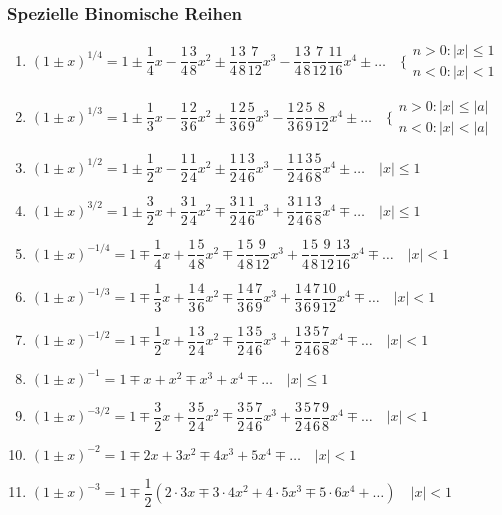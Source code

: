 \subsubsection{Spezielle Binomische Reihen}
\begin{enumerate}[$(a)$]
\item $\left(1\pm x\right)^{1/4}=1\pm \dfrac{1}{4}x-\dfrac{1}{4}\dfrac{3}{8}x^2\pm \dfrac{1}{4}\dfrac{3}{8}\dfrac{7}{12}x^3-\dfrac{1}{4}\dfrac{3}{8}\dfrac{7}{12}\dfrac{11}{16}x^4\pm \dotso\quad \Bigg\{\begin{matrix}n>0: \Big\vert x\Big\vert\leq 1\\n<0: \Big\vert x\Big\vert< 1\end{matrix}$
\item $\left(1\pm x\right)^{1/3}=1\pm \dfrac{1}{3}x-\dfrac{1}{3}\dfrac{2}{6}x^2\pm \dfrac{1}{3}\dfrac{2}{6}\dfrac{5}{9}x^3-\dfrac{1}{3}\dfrac{2}{6}\dfrac{5}{9}\dfrac{8}{12}x^4\pm \dotso\quad \Bigg\{\begin{matrix}n>0: \Big\vert x\Big\vert\leq \Big\vert a\Big\vert\\n<0: \Big\vert x\Big\vert< \Big\vert a\Big\vert\end{matrix}$
\item $\left(1\pm x\right)^{1/2}=1\pm \dfrac{1}{2}x-\dfrac{1}{2}\dfrac{1}{4}x^2\pm \dfrac{1}{2}\dfrac{1}{4}\dfrac{3}{6}x^3-\dfrac{1}{2}\dfrac{1}{4}\dfrac{3}{6}\dfrac{5}{8}x^4\pm \dotso\quad \Big\vert x\Big\vert\leq 1$
\item $\left(1\pm x\right)^{3/2}=1\pm \dfrac{3}{2}x+\dfrac{3}{2}\dfrac{1}{4}x^2\mp \dfrac{3}{2}\dfrac{1}{4}\dfrac{1}{6}x^3+\dfrac{3}{2}\dfrac{1}{4}\dfrac{1}{6}\dfrac{3}{8}x^4\mp \dotso\quad \Big\vert x\Big\vert\leq 1$
\item $\left(1\pm x\right)^{-1/4}=1\mp \dfrac{1}{4}x+\dfrac{1}{4}\dfrac{5}{8}x^2\mp \dfrac{1}{4}\dfrac{5}{8}\dfrac{9}{12}x^3+\dfrac{1}{4}\dfrac{5}{8}\dfrac{9}{12}\dfrac{13}{16}x^4\mp \dotso\quad \Big\vert x\Big\vert< 1$
\item $\left(1\pm x\right)^{-1/3}=1\mp \dfrac{1}{3}x+\dfrac{1}{3}\dfrac{4}{6}x^2\mp \dfrac{1}{3}\dfrac{4}{6}\dfrac{7}{9}x^3+\dfrac{1}{3}\dfrac{4}{6}\dfrac{7}{9}\dfrac{10}{12}x^4\mp \dotso\quad \Big\vert x\Big\vert< 1$
\item $\left(1\pm x\right)^{-1/2}=1\mp \dfrac{1}{2}x+\dfrac{1}{2}\dfrac{3}{4}x^2\mp \dfrac{1}{2}\dfrac{3}{4}\dfrac{5}{6}x^3+\dfrac{1}{2}\dfrac{3}{4}\dfrac{5}{6}\dfrac{7}{8}x^4\mp \dotso\quad \Big\vert x\Big\vert< 1$
\item $\left(1\pm x\right)^{-1}=1\mp x+x^2\mp x^3+x^4\mp \dotso\quad \Big\vert x\Big\vert\leq 1$
\item $\left(1\pm x\right)^{-3/2}=1\mp \dfrac{3}{2}x+\dfrac{3}{2}\dfrac{5}{4}x^2\mp \dfrac{3}{2}\dfrac{5}{4}\dfrac{7}{6}x^3+\dfrac{3}{2}\dfrac{5}{4}\dfrac{7}{6}\dfrac{9}{8}x^4\mp \dotso\quad \Big\vert x\Big\vert< 1$
\item $\left(1\pm x\right)^{-2}=1\mp 2x+3x^2\mp 4x^3+5x^4\mp \dotso\quad \Big\vert x\Big\vert< 1$
\item $\left(1\pm x\right)^{-3}=1\mp \dfrac{1}{2}\left(2\cdot 3x\mp 3\cdot 4x^2+4\cdot 5x^3\mp 5\cdot 6x^4+\dotso\right)\quad \Big\vert x\Big\vert< 1$
\end{enumerate}
